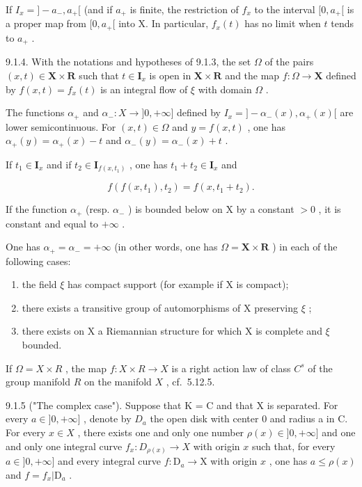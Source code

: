 If \(I_x = ]-a_-,a_+[\) (and if \(a_+\) is finite, the restriction of \(f_x\) to the interval \([0,a_+[\) is a proper map from \([0,a_+[\) into X. In particular, \(f_x(t)\) has no limit when \(t\) tends to \(a_+\) .

9.1.4. With the notations and hypotheses of 9.1.3, the set \(\Omega\) of the pairs \((x,t)\in\mathbf{X}\times\mathbf{R}\) such that \(t\in\mathbf{I}_{x}\) is open in \(\mathbf{X}\times\mathbf{R}\) and the map \(f\colon\Omega\to\mathbf{X}\) defined by \(f(x,t)=f_{x}(t)\) is an integral flow of \(\xi\) with domain \(\Omega\) .

The functions \(\alpha_{+}\) and \(\alpha_{-}: X \to ]0,+\infty]\) defined by \(I_{x} = ]-\alpha_{-}(x),\alpha_{+}(x)[\) are lower semicontinuous. For \((x, t) \in \Omega\) and \(y = f(x, t)\) , one has \(\alpha_{+}(y) = \alpha_{+}(x) - t\) and \(\alpha_{-}(y) = \alpha_{-}(x) + t\) .

If \(t_1 \in \mathbf{I}_x\) and if \(t_2 \in \mathbf{I}_{f(x, t_1)}\) , one has \(t_1 + t_2 \in \mathbf{I}_x\) and

\[
f (f (x, t _ {1}), t _ {2}) = f (x, t _ {1} + t _ {2}).\tag{3}
\]

If the function \(\alpha_{+}\) (resp. \(\alpha_{-}\) ) is bounded below on X by a constant \(>0\) , it is constant and equal to \(+\infty\) .

One has \(\alpha_{+} = \alpha_{-} = +\infty\) (in other words, one has \(\Omega = \mathbf{X} \times \mathbf{R}\) ) in each of the following cases:

\begin{enumerate}
\def\labelenumi{(\roman{enumi})}
\item
  the field \(\xi\) has compact support (for example if X is compact);
\item
  there exists a transitive group of automorphisms of X preserving \(\xi\) ;
\item
  there exists on X a Riemannian structure for which X is complete and \(\xi\) bounded.
\end{enumerate}

If \(\Omega = X \times R\) , the map \(f: X \times R \to X\) is a right action law of class \(C^s\) of the group manifold \(R\) on the manifold \(X\) , cf.~5.12.5.

9.1.5 ("The complex case"). Suppose that K = C and that X is separated. For every \(a \in ]0, +\infty]\) , denote by \(D_a\) the open disk with center 0 and radius a in C. For every \(x \in X\) , there exists one and only one number \(\rho(x) \in ]0, +\infty]\) and one and only one integral curve \(f_x: D_{\rho(x)} \to X\) with origin \(x\) such that, for every \(a \in ]0, +\infty]\) and every integral curve \(f: \mathrm{D}_a \to \mathrm{X}\) with origin \(x\) , one has \(a \leqslant \rho(x)\) and \(f = f_x | \mathrm{D}_a\) .

